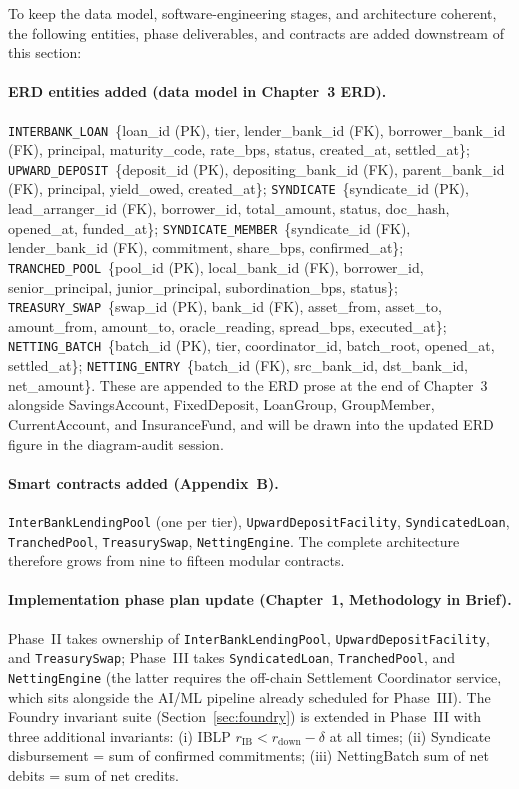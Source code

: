 \documentclass[12pt,a4paper]{report}
\begin{document}
To keep the data model, software-engineering stages, and architecture coherent, the following entities, phase deliverables, and contracts are added downstream of this section:

\paragraph{ERD entities added (data model in Chapter~3 ERD).}
\texttt{INTERBANK\_LOAN}~\{loan\_id (PK), tier, lender\_bank\_id (FK), borrower\_bank\_id (FK), principal, maturity\_code, rate\_bps, status, created\_at, settled\_at\}; \texttt{UPWARD\_DEPOSIT}~\{deposit\_id (PK), depositing\_bank\_id (FK), parent\_bank\_id (FK), principal, yield\_owed, created\_at\}; \texttt{SYNDICATE}~\{syndicate\_id (PK), lead\_arranger\_id (FK), borrower\_id, total\_amount, status, doc\_hash, opened\_at, funded\_at\}; \texttt{SYNDICATE\_MEMBER}~\{syndicate\_id (FK), lender\_bank\_id (FK), commitment, share\_bps, confirmed\_at\}; \texttt{TRANCHED\_POOL}~\{pool\_id (PK), local\_bank\_id (FK), borrower\_id, senior\_principal, junior\_principal, subordination\_bps, status\}; \texttt{TREASURY\_SWAP}~\{swap\_id (PK), bank\_id (FK), asset\_from, asset\_to, amount\_from, amount\_to, oracle\_reading, spread\_bps, executed\_at\}; \texttt{NETTING\_BATCH}~\{batch\_id (PK), tier, coordinator\_id, batch\_root, opened\_at, settled\_at\}; \texttt{NETTING\_ENTRY}~\{batch\_id (FK), src\_bank\_id, dst\_bank\_id, net\_amount\}. These are appended to the ERD prose at the end of Chapter~3 alongside SavingsAccount, FixedDeposit, LoanGroup, GroupMember, CurrentAccount, and InsuranceFund, and will be drawn into the updated ERD figure in the diagram-audit session.

\paragraph{Smart contracts added (Appendix~B).}
\texttt{InterBankLendingPool} (one per tier), \texttt{UpwardDepositFacility}, \texttt{SyndicatedLoan}, \texttt{TranchedPool}, \texttt{TreasurySwap}, \texttt{NettingEngine}. The complete architecture therefore grows from nine to fifteen modular contracts.

\paragraph{Implementation phase plan update (Chapter~1, Methodology in Brief).}
Phase~II takes ownership of \texttt{InterBankLendingPool}, \texttt{UpwardDepositFacility}, and \texttt{TreasurySwap}; Phase~III takes \texttt{SyndicatedLoan}, \texttt{TranchedPool}, and \texttt{NettingEngine} (the latter requires the off-chain Settlement Coordinator service, which sits alongside the AI/ML pipeline already scheduled for Phase~III). The Foundry invariant suite (Section~\ref{sec:foundry}) is extended in Phase~III with three additional invariants: (i) IBLP $r_{\text{IB}} < r_{\text{down}} - \delta$ at all times; (ii) Syndicate disbursement = sum of confirmed commitments; (iii) NettingBatch sum of net debits = sum of net credits.
\end{document}
